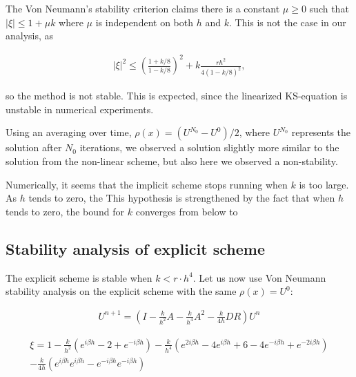 


The Von Neumann's stability criterion claims there is a constant $\mu \ge 0$ such that $|\xi| \le 1+ \mu k$ where $\mu$ is independent on both $h$ and $k$. This is not the case in our analysis, as 

\begin{align*}
|\xi |^2 \le \left(\frac{1+k/8}{1-k/8}\right)^2 + k\frac{rh^2}{4(1-k/8)^2},
\end{align*}

so the method is not stable. This is expected, since the linearized KS-equation is unstable in numerical experiments. 

Using an averaging over time, $\rho(x) = (U^{N_0}-U^0)/2$, where $U^{N_0}$ represents the solution after $N_0$ iterations, we observed a solution slightly more similar to the solution from the non-linear scheme, but also here we observed a non-stability.
 
Numerically, it seems that the implicit scheme stops running when $k$ is too large. As $h$ tends to zero, the 
 This hypothesis is strengthened by the fact that when $h$ tends to zero, the bound for $k$ converges from below to 


\subsection*{Stability analysis of explicit scheme}

The explicit scheme is stable when $k < r \cdot h^4$. Let us now use Von Neumann stability analysis on the explicit scheme with the same $\rho(x) = U^0$:


\begin{align*}
U^{n+1} = \left(I - \frac{k}{h^2}A - \frac{k}{h^4}A^2 - \frac{k}{4h} DR\right)U^{n} 
\end{align*}


\begin{align*}
\xi = 1 - \frac{k}{h^2}(e^{i\beta h}-2+e^{-i\beta h}) - \frac{k}{h^4}(e^{2i\beta h}-4e^{i\beta h}+6-4e^{-i\beta h}+e^{-2i\beta h}) \\
 - \frac{k}{4h}(e^{i\beta h}e^{i\beta h} - e^{-i\beta h}e^{-i\beta h})\\
\end{align*}

